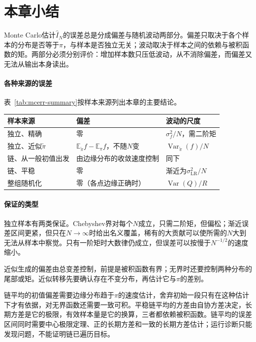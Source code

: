 \section{本章小结}
\label{sec:mcerr-summary}

Monte Carlo估计$\hat{I}_N$的误差总是分成偏差与随机波动两部分。偏差只取决于各个样本的分布是否等于$\pi$，与样本是否独立无关；波动取决于样本之间的依赖与被积函数的矩。两部分必须分别评价：增加样本数只压低波动，从不消除偏差，而偏差又无法从输出本身读出。

\paragraph{各种来源的误差}
表~\ref{tab:mcerr-summary}按样本来源列出本章的主要结论。

\begin{BookInlineTable}
 \centering
 \caption{不同样本来源下的误差}
 \label{tab:mcerr-summary}
 \begin{tabular}{lll}
  \toprule
  样本来源 & 偏差 & 波动的尺度 \\
  \midrule
  独立、精确 & 零 & $\sigma_f^{2}/N$，需二阶矩 \\
  独立、近似$\tilde{\pi}$ & $\mathbb{E}_{\tilde{\pi}}f-\mathbb{E}_{\pi}f$，不随$N$变 & $\operatorname{Var}_{\tilde{\pi}}(f)/N$ \\
  链、从一般初值出发 & 由边缘分布的收敛速度控制 & 同下 \\
  链、平稳 & 零 & 渐近为$\sigma_{\mathrm{LR}}^{2}/N$ \\
  整组随机化 & 零（各点边缘正确时） & $\operatorname{Var}(Q)/R$ \\
  \bottomrule
 \end{tabular}
\end{BookInlineTable}

\paragraph{保证的类型}
独立样本有两类保证。Chebyshev界对每个$N$成立，只需二阶矩，但偏松；渐近误差区间更紧，但只在$N\to\infty$时给出名义覆盖，稀有的大贡献可以使所需的$N$大到无法从样本中察觉。只有一阶矩时大数律仍成立，但误差可以按慢于$N^{-1/2}$的速度缩小。

近似生成的偏差由总变差控制，前提是被积函数有界；无界时还要控制两种分布的尾部或矩。近似转移先要确认存在不变分布，再估计它与$\pi$的差别。

链平均的初值偏差需要边缘分布趋于$\pi$的速度估计，舍弃初始一段只有在这种估计下才有依据，对无界函数还需要一致可积。平稳链平均的方差由自协方差决定，长期方差是它的极限，有效样本量是它的换算，三者都依赖被积函数。链平均的误差区间同时需要中心极限定理、正的长期方差和一致的长期方差估计；运行诊断只能发现问题，不能证明链已遍历目标。

